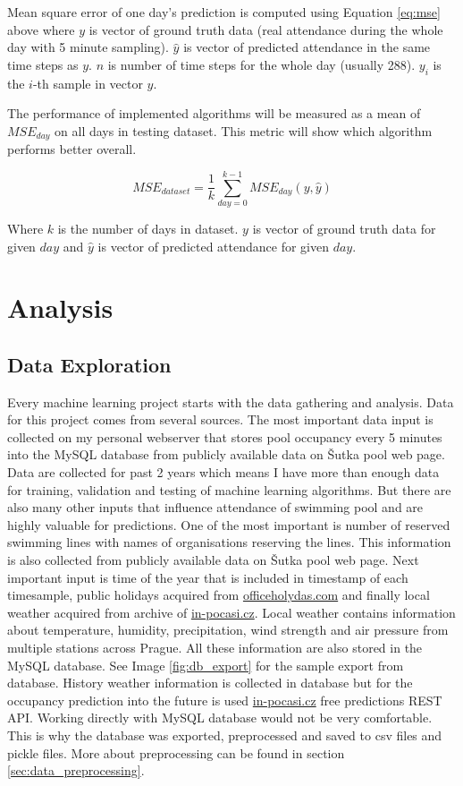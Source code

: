 \documentclass{article}
\begin{document}
Mean square error of one day's prediction is computed using Equation \ref{eq:mse} above where $y$ is vector of ground truth data (real attendance during the whole day with 5 minute sampling). $\hat{y}$ is vector of predicted attendance in the same time steps as $y$. $n$ is number of time steps for the whole day (usually 288). $y_i$ is the $i$-th sample in vector $y$. 

The performance of implemented algorithms will be measured as a mean of $MSE_{day}$ on all days in testing dataset. This metric will show which algorithm performs better overall.

\begin{equation}
\label{eq:mse_all}
MSE_{dataset} = \dfrac{1}{k} \sum^{k-1}_{day=0}MSE_{day}(y,\hat{y})
\end{equation}

Where $k$ is the number of days in dataset. $y$ is vector of ground truth data for given $day$ and $\hat{y}$ is vector of predicted attendance for given $day$.

\section{Analysis}
\subsection{Data Exploration} \label{sec:data_exploration}

Every machine learning project starts with the data gathering and analysis. Data for this project comes from several sources. The most important data input is collected on my personal webserver that stores pool occupancy every 5 minutes into the MySQL database from publicly available data on \v{S}utka pool web page. Data are collected for past 2 years which means I have more than enough data for training, validation and testing of machine learning algorithms. But there are also many other inputs that influence attendance of swimming pool and are highly valuable for predictions. One of the most important is number of reserved swimming lines with names of organisations reserving the lines. This information is also collected from publicly available data on \v{S}utka pool web page. Next important input is time of the year that is included in timestamp of each timesample, public holidays acquired from \href{https://www.officeholidays.com/countries/czech-republic}{officeholydas.com} and finally local weather acquired from archive of \href{https://www.in-pocasi.cz/archiv/}{in-pocasi.cz}. Local weather contains information about temperature, humidity, precipitation, wind strength and air pressure from multiple stations across Prague. All these information are also stored in the MySQL database. See Image \ref{fig:db_export} for the sample export from database. History weather information is collected in database but for the occupancy prediction into the future is  used \href{http://www.in-pocasi.cz/pocasi-na-web/}{in-pocasi.cz} free predictions REST API. Working directly with MySQL database would not be very comfortable. This is why the database was exported, preprocessed and saved to csv files and pickle files. More about preprocessing can be found in section \ref{sec:data_preprocessing}. 
\end{document}
